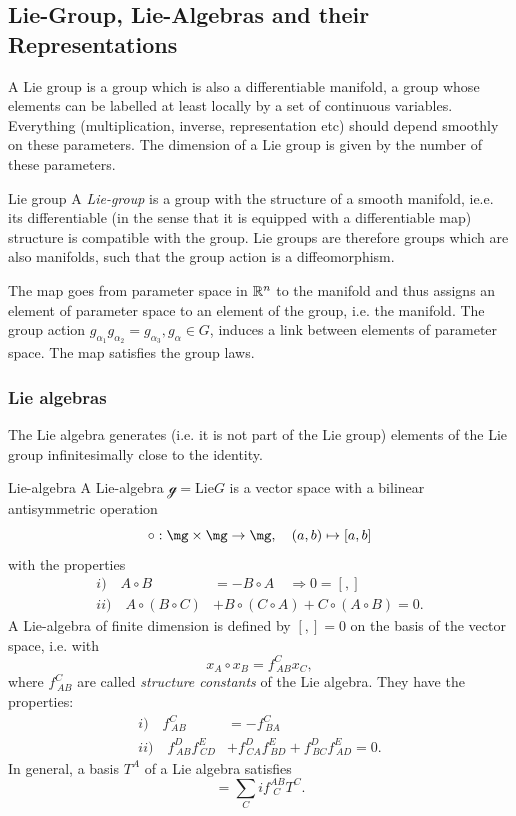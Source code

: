 \subsection{Lie-Group, Lie-Algebras and their Representations}
A Lie group is a group which is also a differentiable manifold, a group whose elements can be labelled at least locally by a set of continuous variables. Everything (multiplication, inverse, representation etc) should depend smoothly on these parameters. The dimension of a Lie group is given by the number of these parameters.
\begin{mybox}{Lie group} 
	A \emph{Lie-group} is a group with the structure of a smooth manifold, ie.e. its differentiable (in the sense that it is equipped with a differentiable map) structure is compatible with the group. Lie groups are therefore groups which are also manifolds, such that the group action is a diffeomorphism. \\
\end{mybox}
The map goes from parameter space in $\mathbb{R}^n$ to the manifold and thus assigns an element of parameter space to an element of the group, i.e. the manifold. The group action $g_{\alpha_1} g_{\alpha_2} =g_{\alpha_3}, g_{\alpha} \in G$, induces a link between elements of parameter space. The map satisfies the group laws.\\

\subsubsection{Lie algebras}
The Lie algebra generates (i.e. it is not part of the Lie group) elements of the Lie group infinitesimally close to the identity.
\begin{mybox}{Lie-algebra}
	A Lie-algebra $\mathcal{g}=$Lie$G$ is a vector space with a bilinear antisymmetric operation
	\begin{equation}
	\circ: \mg \times \mg \rightarrow \mg, \quad (a,b) \mapsto [a,b]
	\end{equation}
	with the properties
	\begin{align}
		i) \quad A\circ B &= - B\circ A \quad \Rightarrow 0 = [,]\\
		ii)\quad A\circ(B\circ C) &+ B\circ (C\circ A) + C\circ (A\circ B) = 0.
	\end{align}
	A Lie-algebra of finite dimension is defined by $[,]=0$ on the basis of the vector space, i.e. with
	\begin{equation}
	x_A \circ x_B = f^C_{\, AB} x_C,
	\end{equation}
	where $f^C_{\,AB}$ are called \emph{structure constants} of the Lie algebra. They have the properties:
	\begin{align}
		i) \quad f^C_{\, AB} &= - f^C_{\, BA} \\
		ii) \quad f^D_{\, AB} f^E_{\, CD} &+ f^D_{\, CA} f^E_{\, BD} + f^D_{\, BC} f^E_{\, AD} =0.
	\end{align}
	In general, a basis $T^A$ of a Lie algebra satisfies
	\begin{equation}
	[T^A,T^B]= \sum_C i f^{AB}_{\,\, C} T^C.
	\end{equation}
\end{mybox}
